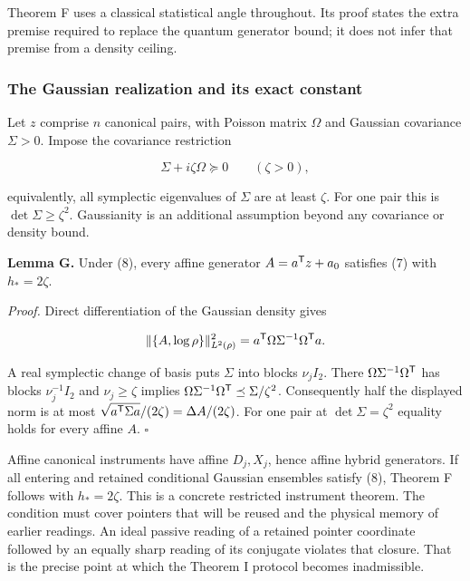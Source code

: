 \documentclass[11pt,a4paper]{article}
\begin{document}
Theorem F uses a classical statistical angle throughout. Its proof
states the extra premise required to replace the quantum generator
bound; it does not infer that premise from a density ceiling.

\hypertarget{the-gaussian-realization-and-its-exact-constant}{%
\subsubsection{The Gaussian realization and its exact
constant}\label{the-gaussian-realization-and-its-exact-constant}}

Let \(z\) comprise \(n\) canonical pairs, with Poisson matrix \(\Omega\)
and Gaussian covariance \(\Sigma>0\). Impose the covariance restriction

\[\Sigma+i\zeta\Omega\succeq0 \qquad(\zeta>0), \tag{8}\]

equivalently, all symplectic eigenvalues of \(\Sigma\) are at least
\(\zeta\). For one pair this is \(\det\Sigma\ge\zeta^2\). Gaussianity is
an additional assumption beyond any covariance or density bound.

\textbf{Lemma G.} Under (8), every affine generator \(A=a^{\sf T}z+a_0\)
satisfies (7) with \(h_*=2\zeta\).

\emph{Proof.} Direct differentiation of the Gaussian density gives

\[\|\{A,\log\rho\}\|_{L^2(\rho)}^2
=a^{\sf T}\Omega\Sigma^{-1}\Omega^{\sf T}a.\]

A real symplectic change of basis puts \(\Sigma\) into blocks
\(\nu_j I_2\). There \(\Omega\Sigma^{-1}\Omega^{\sf T}\) has blocks
\(\nu_j^{-1}I_2\) and \(\nu_j\ge\zeta\) implies
\(\Omega\Sigma^{-1}\Omega^{\sf T}\preceq\Sigma/\zeta^2\). Consequently
half the displayed norm is at most
\(\sqrt{a^{\sf T}\Sigma a}/(2\zeta)=\Delta A/(2\zeta)\). For one pair at
\(\det\Sigma=\zeta^2\) equality holds for every affine \(A\).
\(\square\)

Affine canonical instruments have affine \(D_j,X_j\), hence affine
hybrid generators. If all entering and retained conditional Gaussian
ensembles satisfy (8), Theorem F follows with \(h_*=2\zeta\). This is a
concrete restricted instrument theorem. The condition must cover
pointers that will be reused and the physical memory of earlier
readings. An ideal passive reading of a retained pointer coordinate
followed by an equally sharp reading of its conjugate violates that
closure. That is the precise point at which the Theorem I protocol
becomes inadmissible.
\end{document}
